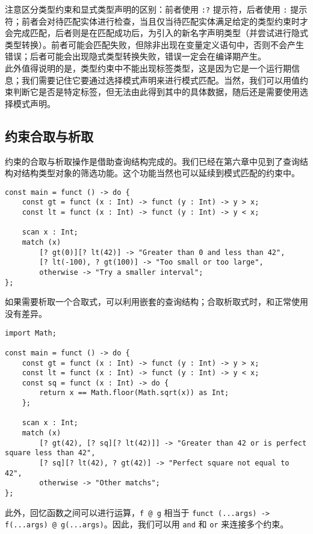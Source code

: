 注意区分类型约束和显式类型声明的区别：前者使用 \lstinline!:?! 提示符，后者使用 \lstinline!:! 提示符；前者会对待匹配实体进行检查，当且仅当待匹配实体满足给定的类型约束时才会完成匹配，后者则是在匹配成功后，为引入的新名字声明类型（并尝试进行隐式类型转换）。前者可能会匹配失败，但除非出现在变量定义语句中，否则不会产生错误；后者可能会出现隐式类型转换失败，错误一定会在编译期产生。 \\

此外值得说明的是，类型约束中不能出现标签类型，这是因为它是一个运行期信息；我们需要记住它要通过选择模式声明来进行模式匹配。当然，我们可以用值约束判断它是否是特定标签，但无法由此得到其中的具体数据，随后还是需要使用选择模式声明。

\subsection{约束合取与析取}

约束的合取与析取操作是借助查询结构完成的。我们已经在第六章中见到了查询结构对结构类型对象的筛选功能。这个功能当然也可以延续到模式匹配的约束中。

\begin{lstlisting}
const main = funct () -> do {
	const gt = funct (x : Int) -> funct (y : Int) -> y > x;
	const lt = funct (x : Int) -> funct (y : Int) -> y < x;
	
	scan x : Int;
	match (x)
		[? gt(0)][? lt(42)] -> "Greater than 0 and less than 42",
		[? lt(-100), ? gt(100)] -> "Too small or too large",
		otherwise -> "Try a smaller interval";
};
\end{lstlisting}

如果需要析取一个合取式，可以利用嵌套的查询结构；合取析取式时，和正常使用没有差异。

\begin{lstlisting}
import Math;

const main = funct () -> do {
	const gt = funct (x : Int) -> funct (y : Int) -> y > x;
	const lt = funct (x : Int) -> funct (y : Int) -> y < x;
	const sq = funct (x : Int) -> do {
		return x == Math.floor(Math.sqrt(x)) as Int;
	};

	scan x : Int;
	match (x)
		[? gt(42), [? sq][? lt(42)]] -> "Greater than 42 or is perfect square less than 42",
		[? sq][? lt(42), ? gt(42)] -> "Perfect square not equal to 42",
		otherwise -> "Other matchs";
};
\end{lstlisting}

此外，回忆函数之间可以进行运算，\lstinline!f @ g! 相当于 \lstinline!funct (...args) -> f(...args) @ g(...args)!。因此，我们可以用 \lstinline!and! 和 \lstinline!or! 来连接多个约束。

